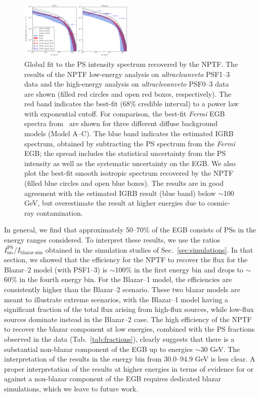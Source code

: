 \begin{figure}[b] %
   \centering
   \includegraphics[width=0.48\textwidth]{ch-igrb/plots/spectra_new_simp.pdf} 
   \caption{Global fit to the PS intensity spectrum recovered by the NPTF. The results of the NPTF low-energy analysis on {\it ultracleanveto} PSF1--3 data and the high-energy analysis on {\it ultracleeanveto} PSF0--3 data are shown (filled red circles and open red boxes, respectively).  The red band indicates the best-fit (68\% credible interval) to a power law with exponential cutoff.  For comparison, the best-fit \emph{Fermi} EGB spectra from~\cite{Ackermann:2014usa} are shown for three different diffuse background models (Model A--C).  The blue band indicates the estimated IGRB spectrum, obtained by subtracting the PS spectrum from the \emph{Fermi} EGB; the spread includes the statistical uncertainty from the PS intensity as well as the systematic uncertainty on the EGB.  We also plot the best-fit smooth isotropic spectrum recovered by the NPTF (filled blue circles and open blue boxes).  The results are in good agreement with the estimated IGRB result (blue band) below $\sim$100 GeV, but overestimate the result at higher energies due to cosmic-ray contamination.  
    } 
   \label{fig:global}
\end{figure}


In general, we find that approximately 50--70\% of the EGB consists of PSs in the energy ranges considered.  To interpret these results, we use the ratios $I_\text{iso}^\text{PS} / I_\text{blazar-sim}$ obtained in the simulation studies of Sec.~\ref{sec:simulations}.  In that section, we showed that the efficiency for the NPTF to recover the flux for the Blazar--2 model (with PSF1--3) is 
$\sim$100\% in the first energy bin and drops to $\sim$60\% in the fourth energy bin.  For the Blazar--1 model, the efficiencies are consistently higher than the Blazar--2 scenario.  These two blazar models are meant to illustrate extreme scenarios, with the Blazar--1 model having a significant fraction of the total flux arising from high-flux sources, while low-flux sources dominate instead in the Blazar--2 case. 
The high efficiency of the NPTF to recover the blazar component at low energies, combined with the PS fractions observed in the data (Tab.~\ref{tab:fractions}), clearly suggests that there is a substantial non-blazar component of the EGB up to energies $\sim$30 GeV.   The interpretation of the results in the energy bin from 30.0--94.9 GeV is less clear.  A proper interpretation of the results at higher energies in terms of evidence for or against a non-blazar component of the EGB requires dedicated blazar simulations, which we leave to future work.  
 
